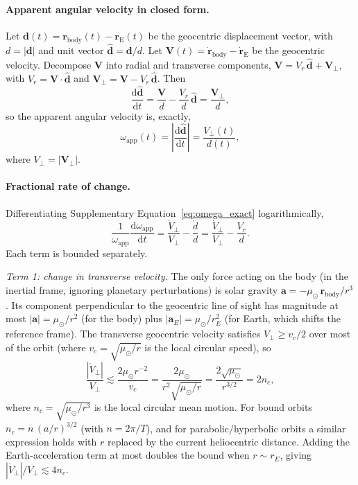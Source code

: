 \documentclass[11pt,a4paper]{article}
\begin{document}
\paragraph{Apparent angular velocity in closed form.}
Let $\mathbf{d}(t) = \mathbf{r}_\mathrm{body}(t) - \mathbf{r}_\mathrm{E}(t)$
be the geocentric displacement vector, with
$d = |\mathbf{d}|$ and unit vector $\hat{\mathbf{d}} = \mathbf{d}/d$.
Let $\mathbf{V}(t) = \dot{\mathbf{r}}_\mathrm{body} - \dot{\mathbf{r}}_\mathrm{E}$
be the geocentric velocity.
Decompose $\mathbf{V}$ into radial and transverse components,
$\mathbf{V} = V_r\,\hat{\mathbf{d}} + \mathbf{V}_\perp$,
with $V_r = \mathbf{V}\cdot\hat{\mathbf{d}}$ and
$\mathbf{V}_\perp = \mathbf{V} - V_r\,\hat{\mathbf{d}}$. Then
\begin{equation}
  \frac{\mathrm{d}\hat{\mathbf{d}}}{\mathrm{d}t}
  = \frac{\mathbf{V}}{d} - \frac{V_r}{d}\,\hat{\mathbf{d}}
  = \frac{\mathbf{V}_\perp}{d},
\end{equation}
so the apparent angular velocity is, exactly,
\begin{equation}
  \label{eq:omega_exact}
  \omega_\mathrm{app}(t) = \left|\frac{\mathrm{d}\hat{\mathbf{d}}}{\mathrm{d}t}\right|
  = \frac{V_\perp(t)}{d(t)},
\end{equation}
where $V_\perp = |\mathbf{V}_\perp|$.

\paragraph{Fractional rate of change.}
Differentiating Supplementary Equation~\eqref{eq:omega_exact} logarithmically,
\begin{equation}
  \label{eq:domega_frac}
  \frac{1}{\omega_\mathrm{app}}\frac{\mathrm{d}\omega_\mathrm{app}}{\mathrm{d}t}
  = \frac{\dot{V}_\perp}{V_\perp} - \frac{\dot{d}}{d}
  = \frac{\dot{V}_\perp}{V_\perp} - \frac{V_r}{d}.
\end{equation}
Each term is bounded separately.

\textit{Term 1: change in transverse velocity.}
The only force acting on the body (in the inertial frame, ignoring planetary
perturbations) is solar gravity $\mathbf{a} = -\mu_\odot\,\mathbf{r}_\mathrm{body}/r^3$.
Its component perpendicular to the geocentric line of sight has magnitude at most
$|\mathbf{a}| = \mu_\odot/r^2$ (for the body) plus $|\mathbf{a}_E| = \mu_\odot/r_E^2$
(for Earth, which shifts the reference frame).
The transverse geocentric velocity satisfies $V_\perp \ge v_c/2$ over most of the
orbit (where $v_c = \sqrt{\mu_\odot/r}$ is the local circular speed), so
\begin{equation}
  \frac{|\dot{V}_\perp|}{V_\perp}
  \lesssim \frac{2\mu_\odot r^{-2}}{v_c}
  = \frac{2\mu_\odot}{r^2\sqrt{\mu_\odot/r}}
  = \frac{2\sqrt{\mu_\odot}}{r^{3/2}}
  = 2n_c,
\end{equation}
where $n_c = \sqrt{\mu_\odot/r^3}$ is the local circular mean motion.
For bound orbits $n_c = n\,(a/r)^{3/2}$ (with $n=2\pi/T$), and for
parabolic/hyperbolic orbits a similar expression holds with $r$ replaced by
the current heliocentric distance. Adding the Earth-acceleration term at most
doubles the bound when $r \sim r_E$, giving $|\dot{V}_\perp|/V_\perp \lesssim 4n_c$.
\end{document}
